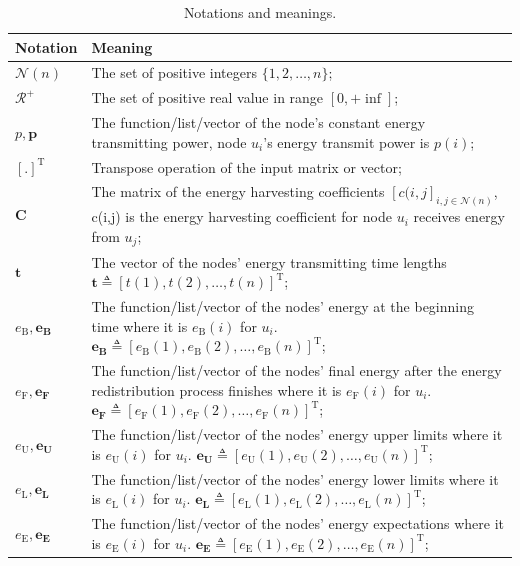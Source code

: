 \documentclass[journal,10pt]{IEEEtran}
\begin{document}
\begin{table}[!htbp]
\centering
\caption{Notations and meanings.}
\label{T1}
\footnotesize{
\begin{tabular}
{|p{}|p{}|}
\hline
\textbf{Notation} & Meaning\\
\hline
$\mathcal{N}(n)$ & The set of positive integers $\{1,2,\ldots,n\}$;\\
\hline
$\mathcal{R^{+}}$ & The set of positive real value in range $[0,{+}\inf]$;\\
\hline
$p, \mathbf{p}$ & The function/list/vector of the node's constant energy transmitting power, node $u_i$'s energy transmit power is $p(i)$;\\
\hline
$[.]^{\text{T}}$ & Transpose operation of the input matrix or vector;\\
\hline
$\mathbf{C}$ & The matrix of the energy harvesting coefficients $[c(i,j]_{i,j{\in}\mathcal{N}(n)}$, c(i,j) is the energy harvesting coefficient for node $u_i$ receives energy from $u_j$;\\
\hline
$\mathbf{t}$ & The vector of the nodes' energy transmitting time lengths $\mathbf{t}{\triangleq}[t(1),t(2),\ldots,t(n)]^{\text{T}}$;\\
\hline
$e_\text{B}, \mathbf{e_\text{B}}$ & The function/list/vector of the nodes' energy at the beginning time where it is $e_\text{B}(i)$ for $u_i$.  $\mathbf{e_\text{B}}{\triangleq}[e_\text{B}(1),e_\text{B}(2),\ldots,e_\text{B}(n)]^{\text{T}}$;\\
\hline
$e_\text{F}, \mathbf{e_\text{F}}$ & The function/list/vector of the nodes' final energy after the energy redistribution process finishes where it is $e_\text{F}(i)$ for $u_i$. $\mathbf{e_\text{F}}{\triangleq}[e_\text{F}(1),e_\text{F}(2),\ldots,e_\text{F}(n)]^{\text{T}}$;\\
\hline
$e_\text{U}, \mathbf{e_\text{U}}$ & The function/list/vector of the nodes' energy upper limits where it is $e_\text{U}(i)$ for $u_i$. $\mathbf{e_\text{U}}{\triangleq}[e_\text{U}(1),e_\text{U}(2),\ldots,e_\text{U}(n)]^{\text{T}}$;\\
\hline
$e_\text{L}, \mathbf{e_\text{L}}$ & The function/list/vector of the nodes' energy lower limits where it is $e_\text{L}(i)$ for $u_i$. $\mathbf{e_\text{L}}{\triangleq}[e_\text{L}(1),e_\text{L}(2),\ldots,e_\text{L}(n)]^{\text{T}}$;\\
\hline
$e_\text{E}, \mathbf{e_\text{E}}$ & The function/list/vector of the nodes' energy expectations where it is $e_\text{E}(i)$ for $u_i$. $\mathbf{e_\text{E}}{\triangleq}[e_\text{E}(1),e_\text{E}(2),\ldots,e_\text{E}(n)]^{\text{T}}$;\\

\end{tabular}}
\end{table}
\end{document}
